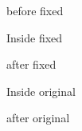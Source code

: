 \documentclass{article}
\let\originalFrameCommand\FrameCommand
\let\originalMakeFramed\MakeFramed
\let\originalendMakeFramed\endMakeFramed
\begin{document}
\color{blue}


before fixed

\begin{framed}
\color{red}
Inside fixed
\end{framed}

after fixed

\let\FrameCommand\originalFrameCommand
\let\MakeFramed\originalMakeFramed
\let\endMakeFramed\originalendMakeFramed

\begin{framed}
\color{red}
\smash{\rule{1pt}{4cm}}\kern-1pt Inside original
\end{framed}

after original
\end{document}
